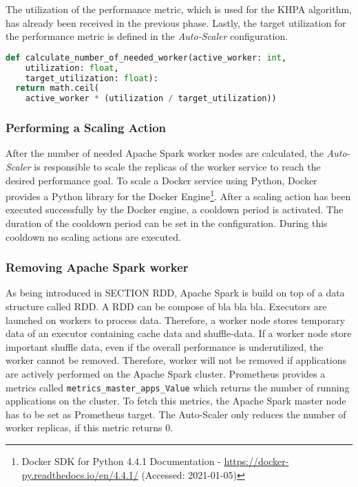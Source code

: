 The utilization of the performance metric, which is used for the KHPA algorithm, has already been received in the previous phase. Lastly, the target utilization for the performance metric is defined in the \textit{Auto-Scaler} configuration. 
\begin{lstlisting}[label=lst:06_auto-scaler_plan_khpa, caption=KHPA implementation using Python 3.8, language=Python]
def calculate_number_of_needed_worker(active_worker: int,
    utilization: float,
    target_utilization: float):
  return math.ceil(
    active_worker * (utilization / target_utilization))
\end{lstlisting}


\subsubsection{Performing a Scaling Action}
After the number of needed Apache Spark worker nodes are calculated, the \textit{Auto-Scaler} is responsible to scale the replicas of the worker service to reach the desired performance goal.
To scale a Docker service using Python, Docker provides a Python library for the Docker Engine\footnote{Docker SDK for Python 4.4.1 Documentation - \url{https://docker-py.readthedocs.io/en/4.4.1/} (Accessed: 2021-01-05)}. 
After a scaling action has been executed successfully by the Docker engine, a cooldown period is activated. The duration of the cooldown period can be set in the configuration. During this cooldown no scaling actions are executed.


\subsubsection{Removing Apache Spark worker}
As being introduced in SECTION RDD, Apache Spark is build on top of a data structure called RDD. A RDD can be compose of bla bla bla.
Executors are launched on workers to process data. Therefore, a worker node stores temporary data of an executor containing cache data and shuffle-data.
If a worker node store important shuffle data, even if the overall performance is underutilized, the worker cannot be removed.
Therefore, worker will not be removed if applications are actively performed on the Apache Spark cluster.
Prometheus provides a metrics called \texttt{metrics\_master\_apps\_Value} which returns the number of running applications on the cluster. To fetch this metrics, the Apache Spark master node has to be set as Prometheus target.
The Auto-Scaler only reduces the number of worker replicas, if this metric returns 0.


